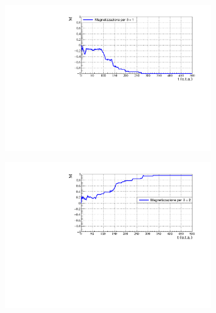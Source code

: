 \documentclass[letterpaper,10pt]{article}
\begin{document}
\begin{figure}[h]
\centering
\begin{subfigure}{0.95\textwidth}
\centering
\includegraphics[width=0.9\linewidth]{Gravitazione/mag_d1.pdf}
\end{subfigure}
\begin{subfigure}{0.95\textwidth}
\centering
\includegraphics[width=0.9\linewidth]{Gravitazione/mag_d2.pdf}
\end{subfigure}
\end{figure}
\end{document}
